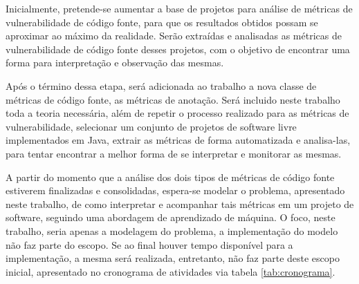 Inicialmente, pretende-se aumentar a base de projetos para análise de métricas
de vulnerabilidade de código fonte, para que os resultados obtidos possam
se aproximar ao máximo da realidade. Serão extraídas e analisadas as métricas de
vulnerabilidade de código fonte desses projetos, com o objetivo de encontrar uma
forma para interpretação e observação das mesmas.

Após o término dessa etapa, será adicionada ao trabalho a nova classe de
métricas de código fonte, as métricas de anotação. Será incluido neste
trabalho toda a teoria necessária, além de repetir o processo realizado para as
métricas de vulnerabilidade, selecionar um conjunto de projetos de software livre
implementados em Java, extrair as métricas de forma automatizada e analisa-las,
para tentar encontrar a melhor forma de se interpretar e monitorar as mesmas.

A partir do momento que a análise dos dois tipos de métricas de código fonte
estiverem finalizadas e consolidadas, espera-se modelar o problema, apresentado
neste trabalho, de como interpretar e acompanhar tais métricas em um projeto de
software, seguindo uma abordagem de aprendizado de máquina. O foco, neste
trabalho, seria apenas a modelagem do problema, a implementação do modelo não
faz parte do escopo. Se ao final houver tempo disponível para a implementação, a
mesma será realizada, entretanto, não faz parte deste escopo inicial,
apresentado no cronograma de atividades via tabela \ref{tab:cronograma}.

